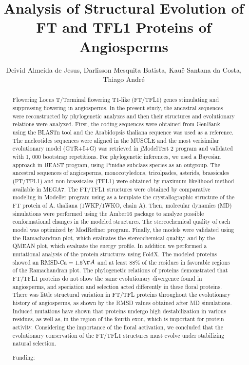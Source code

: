 \documentclass[twoside]{article}
\title{\vspace{-15mm}\fontsize{24pt}{10pt}\selectfont\textbf{ Analysis of Structural Evolution of FT and TFL1 Proteins of Angiosperms }} %
\author{ Deivid Almeida de Jesus, Darlisson Mesquita Batista, Kau\^e Santana da Costa, Thiago Andr\'e }
\affil{ UFOPA }
\date{}
\begin{document}
  
  
  \maketitle %
  
  
  \thispagestyle{fancy} %
  
  
  \begin{abstract}
  Flowering Locus T/Terminal flowering T1-like (FT/TFL1) genes stimulating and suppressing flowering in angiosperms. In the present study,  the ancestral sequences were reconstructed by phylogenetic analyzes and then their structures and evolutionary relations were analyzed. First,  the coding sequences were obtained from GenBank using the BLASTn tool and the Arabidopsis thaliana sequence was used as a reference. The nucleotides sequences were aligned in the MUSCLE and the most verisimilar evolutionary model (GTR+I+G) was retrieved in jModelTest 2 program and validated with 1, 000 bootstrap repetitions. For phylogenetic inferences,  we used a Bayesian approach in BEAST program,  using Pinidae subclass species as an outgroup. The ancestral sequences of angiosperms,  monocotyledons,  tricolpades,  asterids,  brassicales (FT/TFL1) and non-brassicales (TFL1) were obtained by maximum likelihood method available in MEGA7. The FT/TFL1 structures were obtained by comparative modeling in Modeller program using as a template the crystallographic structure of the FT protein of A. thaliana (1WKP/1WKO,  chain A). Then,  molecular dynamics (MD) simulations were performed using the Amber16 package to analyze possible conformational changes in the modeled structures. The stereochemical quality of each model was optimized by ModRefiner program. Finally,  the models were validated using the Ramachandran plot,  which evaluates the stereochemical quality; and by the QMEAN plot,  which evaluate the energy profile. In addition we performed a mutational analysis of the protein structures using FoldX. The modeled proteins showed an RMSD-Ca = 1.6$\AA$ and at least 88\% of the residues in favorable regions of the Ramachandran plot. The phylogenetic relations of proteins demonstrated that FT/TFL1 proteins do not show the same evolutionary divergence found in angiosperms,  and speciation and selection acted differently in these floral proteins. There was little structural variation in FT/TFL proteins throughout the evolutionary history of angiosperms,  as shown by the RMSD values obtained after MD simulations. Induced mutations have shown that proteins undergo high destabilization in various residues,  as well as,  in the region of the fourth exon,  which is important for protein activity. Considering the importance of the floral activation,  we concluded that the evolutionary conservation of the FT/TFL1 structures must evolve under stabilizing natural selection.
  
  Funding:  \\ 
  \end{abstract}
  
\end{document}
